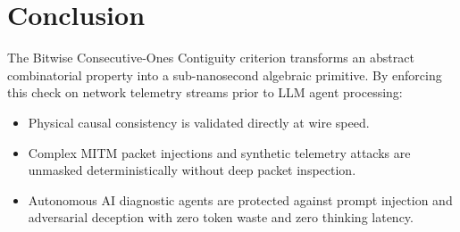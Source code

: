 \documentclass[11pt,a4paper]{article}
\theoremstyle{definition}
\begin{document}
\section{Conclusion}

The Bitwise Consecutive-Ones Contiguity criterion transforms an abstract combinatorial property into a sub-nanosecond algebraic primitive. By enforcing this check on network telemetry streams prior to LLM agent processing:
\begin{itemize}
    \item Physical causal consistency is validated directly at wire speed.
    \item Complex MITM packet injections and synthetic telemetry attacks are unmasked deterministically without deep packet inspection.
    \item Autonomous AI diagnostic agents are protected against prompt injection and adversarial deception with zero token waste and zero thinking latency.
\end{itemize}
\end{document}
